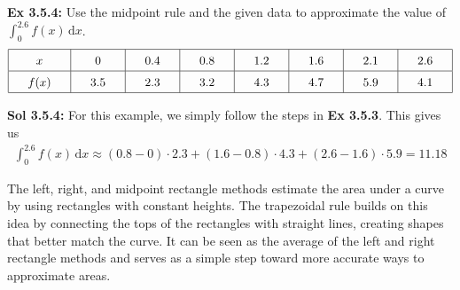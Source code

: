 \begin{tcolorbox}[example]
    \textbf{Ex 3.5.4: } Use the midpoint rule and the given data to approximate the value of $\int_0^{2.6} f(x) \,\mathrm{d}x$. \begin{align*}
        \arraycolsep=16.5pt\def\arraystretch{1.5}
        \begin{array}{|c|c|c|c|c|c|c|c|}
            \hline
            x & 0 & 0.4 & 0.8 & 1.2 & 1.6 & 2.1 & 2.6 \\ \hline
            f(x) & 3.5 & 2.3 & 3.2 & 4.3 & 4.7 & 5.9 & 4.1 \\
            \hline
        \end{array}
    \end{align*}
\end{tcolorbox} 
\begin{tcolorbox}[solution]
    \textbf{Sol 3.5.4: } For this example, we simply follow the steps in \textbf{Ex 3.5.3}. This gives us \begin{align*}
        \int_0^{2.6} f(x) \,\mathrm{d}x \approx (0.8 - 0) \cdot 2.3 + (1.6 - 0.8) \cdot 4.3 + (2.6 - 1.6) \cdot 5.9 = \boxed{11.18}
    \end{align*}
\end{tcolorbox}

The left, right, and midpoint rectangle methods estimate the area under a curve by using rectangles with constant heights. The trapezoidal rule builds on this idea by connecting the tops of the rectangles with straight lines, creating shapes that better match the curve. It can be seen as the average of the left and right rectangle methods and serves as a simple step toward more accurate ways to approximate areas. \par


